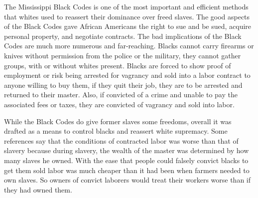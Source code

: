 The Mississippi Black Codes is one of the most important and efficient methods that whites used to reassert their dominance over freed slaves.
The good aspects of the Black Codes gave African Americans the right to sue and be sued, acquire personal property, and negotiate contracts.
The bad implications of the Black Codes are much more numerous and far-reaching.
Blacks cannot carry firearms or knives without permission from the police or the military, they cannot gather groups, with or without whites present.
Blacks are forced to show proof of employment or risk being arrested for vagrancy and sold into a labor contract to anyone willing to buy them, if they quit their job, they are to be arrested and returned to their master.
Also, if convicted of a crime and unable to pay the associated fees or taxes, they are convicted of vagrancy and sold into labor.

While the Black Codes do give former slaves some freedoms, overall it was drafted as a means to control blacks and reassert white supremacy.
Some references say that the conditions of contracted labor was worse than that of slavery because during slavery, the wealth of the master was determined by how many slaves he owned.
With the ease that people could falsely convict blacks to get them sold labor was much cheaper than it had been when farmers needed to own slaves.
So owners of convict laborers would treat their workers worse than if they had owned them.

